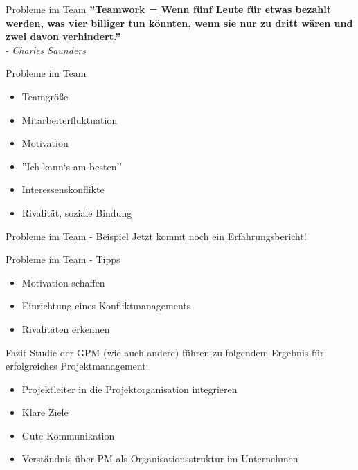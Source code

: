 \documentclass[12pt]{beamer}
\begin{document}
	\begin{frame}{Probleme im Team}
		\textbf{''Teamwork = Wenn fünf Leute für etwas bezahlt werden, was vier billiger tun könnten, wenn sie nur zu dritt wären und zwei davon verhindert.''}\\
- \textit{Charles Saunders}
	\end{frame}

	\begin{frame}{Probleme im Team}
		\begin{itemize}
			\item{Teamgröße}
			\item{Mitarbeiterfluktuation}
			\item{Motivation}
			\item{''Ich kann`s am besten''}
			\item{Interessenskonflikte}
			\item{Rivalität, soziale Bindung}
		\end{itemize}
	\end{frame}

	\begin{frame}{Probleme im Team - Beispiel}
		Jetzt kommt noch ein Erfahrungsbericht!	
	\end{frame}

	\begin{frame}{Probleme im Team - Tipps}
		\begin{itemize}
			\item{Motivation schaffen}
			\item{Einrichtung eines Konfliktmanagements}
			\item{Rivalitäten erkennen}
		\end{itemize}

	\end{frame}


	\begin{frame}{Fazit}
		Studie der GPM (wie auch andere) führen zu folgendem Ergebnis für erfolgreiches Projektmanagement:
		\begin{itemize}
			\item{Projektleiter in die Projektorganisation integrieren}
			\item{Klare Ziele}
			\item{Gute Kommunikation}
			\item{Verständnis über PM als Organisationsstruktur im Unternehmen}
		\end{itemize}
	\end{frame}
	
\end{document}
